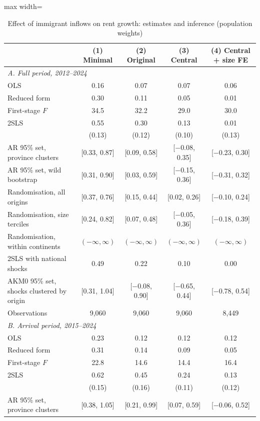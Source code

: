 \begin{table}[!htbp]\centering\small
\caption{Effect of immigrant inflows on rent growth: estimates and inference (population weights)}\label{tab:main}
\begin{adjustbox}{max width=\linewidth}\begin{tabular}{lcccc}\toprule
 & (1) Minimal & (2) Original & (3) Central & (4) Central + size FE \\ \midrule
\multicolumn{5}{l}{\textit{A. Full period, 2012--2024}}\\
OLS & 0.16 & 0.07 & 0.07 & 0.06 \\
Reduced form & 0.30 & 0.11 & 0.05 & 0.01 \\
First-stage $F$ & 34.5 & 32.2 & 29.0 & 30.0 \\
2SLS & 0.55 & 0.30 & 0.13 & 0.01 \\
 & (0.13) & (0.12) & (0.10) & (0.13) \\
AR 95\% set, province clusters & [0.33, 0.87] & [0.09, 0.58] & [$-$0.08, 0.35] & [$-$0.23, 0.30] \\
AR 95\% set, wild bootstrap & [0.31, 0.90] & [0.03, 0.59] & [$-$0.15, 0.36] & [$-$0.31, 0.32] \\
Randomisation, all origins & [0.37, 0.76] & [0.15, 0.44] & [0.02, 0.26] & [$-$0.10, 0.24] \\
Randomisation, size terciles & [0.24, 0.82] & [0.07, 0.48] & [$-$0.05, 0.36] & [$-$0.18, 0.39] \\
Randomisation, within continents & $(-\infty,\infty)$ & $(-\infty,\infty)$ & $(-\infty,\infty)$ & $(-\infty,\infty)$ \\
2SLS with national shocks & 0.49 & 0.22 & 0.10 & 0.00 \\
AKM0 95\% set, shocks clustered by origin & [0.31, 1.04] & [$-$0.08, 0.90] & [$-$0.65, 0.44] & [$-$0.78, 0.54] \\
Observations & 9,060 & 9,060 & 9,060 & 8,449 \\
\midrule
\multicolumn{5}{l}{\textit{B. Arrival period, 2015--2024}}\\
OLS & 0.23 & 0.12 & 0.12 & 0.12 \\
Reduced form & 0.31 & 0.14 & 0.09 & 0.05 \\
First-stage $F$ & 22.8 & 14.6 & 14.4 & 16.4 \\
2SLS & 0.62 & 0.45 & 0.24 & 0.13 \\
 & (0.15) & (0.16) & (0.11) & (0.12) \\
AR 95\% set, province clusters & [0.38, 1.05] & [0.21, 0.99] & [0.07, 0.59] & [$-$0.06, 0.52] \\

\end{tabular}
\end{adjustbox}
\end{table}
